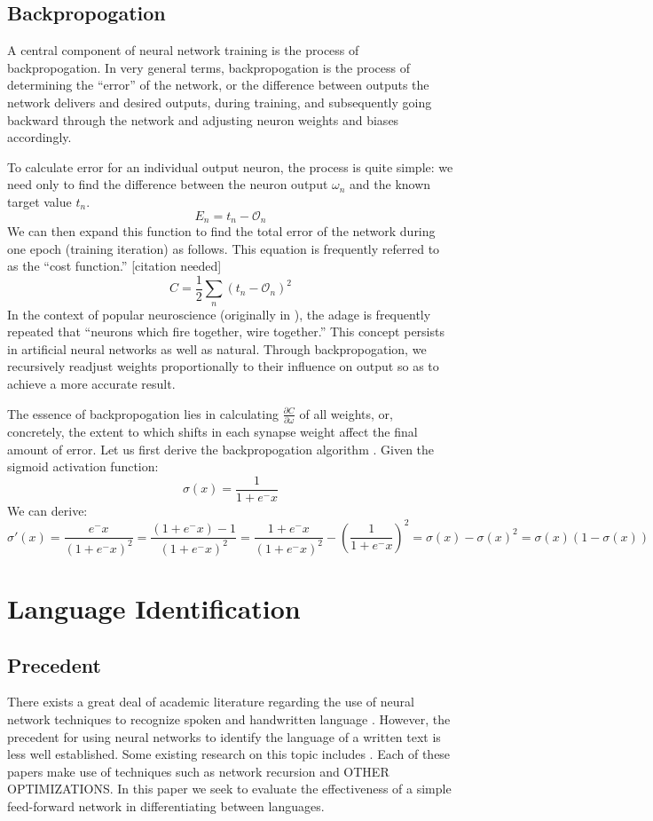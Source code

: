 \documentclass{article}
\begin{document}
\subsection{Backpropogation}
A central component of neural network training is the process of backpropogation. In very general terms, backpropogation is the process of determining the ``error'' of the network, or the difference between outputs the network delivers and desired outputs, during training, and subsequently going backward through the network and adjusting neuron weights and biases accordingly.

To calculate error for an individual output neuron, the process is quite simple: we need only to find the difference between the neuron output $\omega_n$ and the known target value $t_n$.
$$E_n=t_n-\mathcal{O}_n$$
We can then expand this function to find the total error of the network during one epoch (training iteration) as follows. This equation is frequently referred to as the ``cost function.'' [citation needed]
$$C=\frac{1}{2}\sum_n(t_n-\mathcal{O}_n)^2$$
In the context of popular neuroscience (originally in \cite{neuronsfire}), the adage is frequently repeated that ``neurons which fire together, wire together.'' This concept persists in artificial neural networks as well as natural. Through backpropogation, we recursively readjust weights proportionally to their influence on output so as to achieve a more accurate result.

The essence of backpropogation lies in calculating $\frac{\partial{C}}{\partial{\omega}}$ of all weights, or, concretely, the extent to which shifts in each synapse weight affect the final amount of error. Let us first derive the backpropogation algorithm \cite{derivebackprop}. Given the sigmoid activation function:
$$\sigma(x)=\frac{1}{1+e^-x}$$
We can derive:
$$\sigma'(x)=\frac{e^-x}{(1+e^-x)^2}=\frac{(1+e^-x)-1}{(1+e^-x)^2}=\frac{1+e^-x}{(1+e^-x)^2}-\left(\frac{1}{1+e^-x}\right)^2=\sigma(x)-\sigma(x)^2=\sigma(x)(1-\sigma(x))$$

\section{Language Identification}
\subsection{Precedent}
There exists a great deal of academic literature regarding the use of neural network techniques to recognize spoken and handwritten language \cite{rnnspoken}\cite{dcrnnspoken}. However, the precedent for using neural networks to identify the language of a written text is less well established. Some existing research on this topic includes \cite{langidnn}\cite{langidstanford}. Each of these papers make use of techniques such as network recursion and OTHER OPTIMIZATIONS. In this paper we seek to evaluate the effectiveness of a simple feed-forward network in differentiating between languages.
\end{document}
